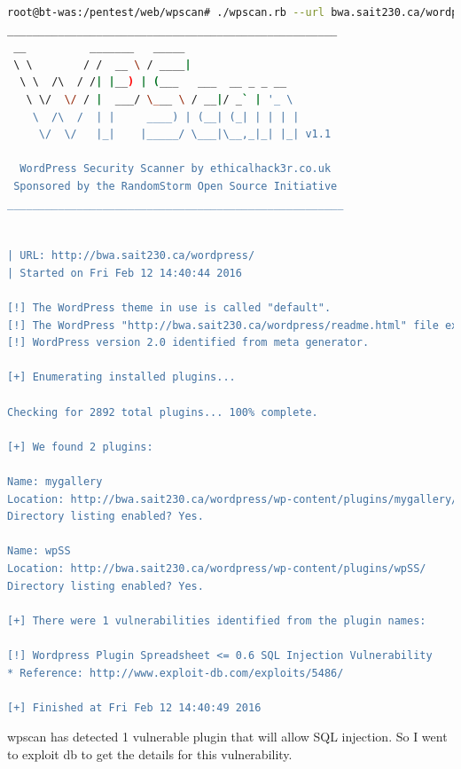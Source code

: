 \documentclass{article}
\begin{document}
\begin{lstlisting}[language=Bash]
root@bt-was:/pentest/web/wpscan# ./wpscan.rb --url bwa.sait230.ca/wordpress --enumerate p
____________________________________________________
 __          _______   _____                  
 \ \        / /  __ \ / ____|                 
  \ \  /\  / /| |__) | (___   ___  __ _ _ __  
   \ \/  \/ / |  ___/ \___ \ / __|/ _` | '_ \ 
    \  /\  /  | |     ____) | (__| (_| | | | |
     \/  \/   |_|    |_____/ \___|\__,_|_| |_| v1.1

  WordPress Security Scanner by ethicalhack3r.co.uk
 Sponsored by the RandomStorm Open Source Initiative
_____________________________________________________


| URL: http://bwa.sait230.ca/wordpress/
| Started on Fri Feb 12 14:40:44 2016

[!] The WordPress theme in use is called "default".
[!] The WordPress "http://bwa.sait230.ca/wordpress/readme.html" file exists.
[!] WordPress version 2.0 identified from meta generator.

[+] Enumerating installed plugins...

Checking for 2892 total plugins... 100% complete.

[+] We found 2 plugins:

Name: mygallery
Location: http://bwa.sait230.ca/wordpress/wp-content/plugins/mygallery/
Directory listing enabled? Yes.

Name: wpSS
Location: http://bwa.sait230.ca/wordpress/wp-content/plugins/wpSS/
Directory listing enabled? Yes.

[+] There were 1 vulnerabilities identified from the plugin names:

[!] Wordpress Plugin Spreadsheet <= 0.6 SQL Injection Vulnerability
* Reference: http://www.exploit-db.com/exploits/5486/

[+] Finished at Fri Feb 12 14:40:49 2016
\end{lstlisting}

wpscan has detected 1 vulnerable plugin that will allow SQL injection. So I went
to exploit db to get the details for this vulnerability.
\end{document}
